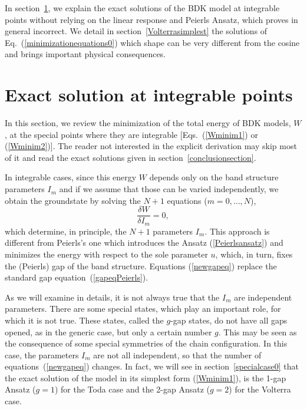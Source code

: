 \documentclass[]{revtex4-1}
\begin{document}
In section~\ref{Todasection}, we explain the exact solutions of the BDK model at integrable points without relying on the linear response and Peierls Ansatz, which proves in general incorrect. We detail in section~\ref{Volterrasimplest} the solutions of Eq.~(\ref{minimizationequations0}) which shape can be very different from the cosine and brings important physical consequences.


\section{Exact solution at integrable points}
\label{Todasection}

In this section, we review the minimization of the total energy of BDK models, $W$, at the special points where they are integrable [Eqs.~(\ref{Wminim1}) or (\ref{Wminim2})].  The reader not interested in the explicit derivation may skip most of it and read the exact solutions given in section~\ref{conclusionsection}.

In integrable cases, since this energy $W$ depends only on the band structure parameters $I_m$ and if we assume that those can be varied independently, we obtain the groundstate by solving the $N+1$ equations ($m=0,\dots,N$), \begin{equation}   \frac{\delta W}{\delta I_m}=0, \label{newgapeq} \end{equation} which determine, in principle, the $N+1$ parameters $I_m$. This approach is different from Peierls's one which introduces the Ansatz (\ref{Peierlsansatz}) and minimizes the energy with respect to the sole parameter $u$, which, in turn, fixes the (Peierls) gap of the band structure. Equations (\ref{newgapeq}) replace the standard gap equation~(\ref{gapeqPeierls}).

As we will examine in details, it is not always true that the $I_m$ are independent parameters. There are some special states, which play an important role, for which it is not true. These states, called the $g$-gap states, do not have all gaps opened, as in the generic case, but only a certain number
$g$. This may be seen as the consequence of some special symmetries of the chain configuration. In this case, the parameters $I_m$ are not all independent, so that the number of equations~(\ref{newgapeq}) changes. In fact, we will see in section~\ref{specialcase0} that the exact solution of the model in its simplest form (\ref{Wminim1}), is the 1-gap Ansatz ($g=1$) for the Toda case and the 2-gap Ansatz ($g=2$) for the Volterra case.
\end{document}
